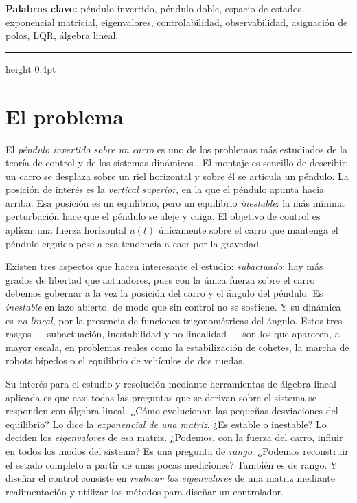 \documentclass[11pt,letterpaper]{article}
\theoremstyle{definition}
\theoremstyle{plain}
\theoremstyle{remark}
\begin{document}
\vspace{0.3em}
\noindent\textbf{Palabras clave:}\;
péndulo invertido, péndulo doble, espacio de estados, exponencial
matricial, eigenvalores, controlabilidad, observabilidad, asignación de
polos, LQR, álgebra lineal.
\vspace{0.8em}
\hrule height 0.4pt
\vspace{1.0em}

\section{El problema}
\label{sec:problema}

El \emph{péndulo invertido sobre un carro} es uno de los problemas más
estudiados de la teoría de control y de los sistemas dinámicos
\cite{ogata2010,chen1999}. El montaje es sencillo de describir: un carro
se desplaza sobre un riel horizontal y sobre él se articula un péndulo.
La posición de interés es la \emph{vertical superior}, en la que el
péndulo apunta hacia arriba. Esa posición es un equilibrio, pero un
equilibrio \emph{inestable}: la más mínima perturbación hace que el
péndulo se aleje y caiga. El objetivo de control es aplicar una fuerza
horizontal $u(t)$  únicamente sobre el carro que 
mantenga el péndulo erguido pese a esa tendencia a caer por la gravedad.

Existen tres aspectos que hacen interesante el estudio:
\emph{subactuado}: hay más grados de libertad que actuadores, pues con la
única fuerza sobre el carro debemos gobernar a la vez la posición del
carro y el ángulo del péndulo. Es \emph{inestable} en lazo abierto, de
modo que sin control no se sostiene. Y su dinámica es \emph{no lineal},
por la presencia de funciones trigonométricas del ángulo. Estos tres
rasgos --- subactuación, inestabilidad y no linealidad --- son los que
aparecen, a mayor escala, en problemas reales como la estabilización de
cohetes, la marcha de robots bípedos o el equilibrio de vehículos de dos
ruedas.

Su interés para el estudio y resolución mediante herramientas de álgebra lineal aplicada es que casi todas las
preguntas que se derivan  sobre el sistema se responden con álgebra
lineal. ¿Cómo evolucionan las pequeñas desviaciones del equilibrio? Lo
dice la \emph{exponencial de una matriz}. ¿Es estable o inestable? Lo
deciden los \emph{eigenvalores} de esa matriz. ¿Podemos, con la fuerza
del carro, influir en todos los modos del sistema? Es una pregunta de
\emph{rango}. ¿Podemos reconstruir el estado completo a partir de unas
pocas mediciones? También es de rango. Y diseñar el control consiste en
\emph{reubicar los eigenvalores} de una matriz mediante realimentación y utilizar los métodos para diseñar un controlador.
\end{document}
